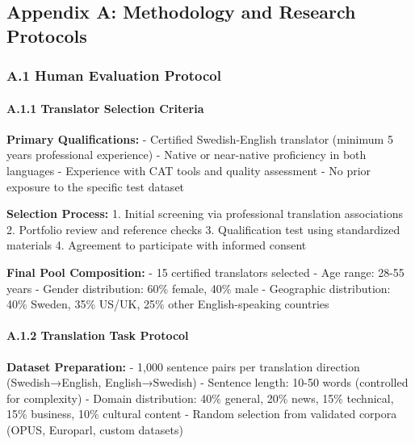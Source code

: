 \documentclass[12pt,a4paper]{article}
\begin{document}
{{{{{\hypertarget{appendix-a-methodology-and-research-protocols}{%
\subsection{Appendix A: Methodology and Research
Protocols}\label{appendix-a-methodology-and-research-protocols}}

\hypertarget{a.1-human-evaluation-protocol}{%
\subsubsection{A.1 Human Evaluation
Protocol}\label{a.1-human-evaluation-protocol}}

\hypertarget{a.1.1-translator-selection-criteria}{%
\paragraph{A.1.1 Translator Selection
Criteria}\label{a.1.1-translator-selection-criteria}}

\textbf{Primary Qualifications:} - Certified Swedish-English translator
(minimum 5 years professional experience) - Native or near-native
proficiency in both languages - Experience with CAT tools and quality
assessment - No prior exposure to the specific test dataset

\textbf{Selection Process:} 1. Initial screening via professional
translation associations 2. Portfolio review and reference checks 3.
Qualification test using standardized materials 4. Agreement to
participate with informed consent

\textbf{Final Pool Composition:} - 15 certified translators selected -
Age range: 28-55 years - Gender distribution: 60\% female, 40\% male -
Geographic distribution: 40\% Sweden, 35\% US/UK, 25\% other
English-speaking countries

\hypertarget{a.1.2-translation-task-protocol}{%
\paragraph{A.1.2 Translation Task
Protocol}\label{a.1.2-translation-task-protocol}}

\textbf{Dataset Preparation:} - 1,000 sentence pairs per translation
direction (Swedish→English, English→Swedish) - Sentence length: 10-50
words (controlled for complexity) - Domain distribution: 40\% general,
20\% news, 15\% technical, 15\% business, 10\% cultural content - Random
selection from validated corpora (OPUS, Europarl, custom datasets)

}}}}}
\end{document}
